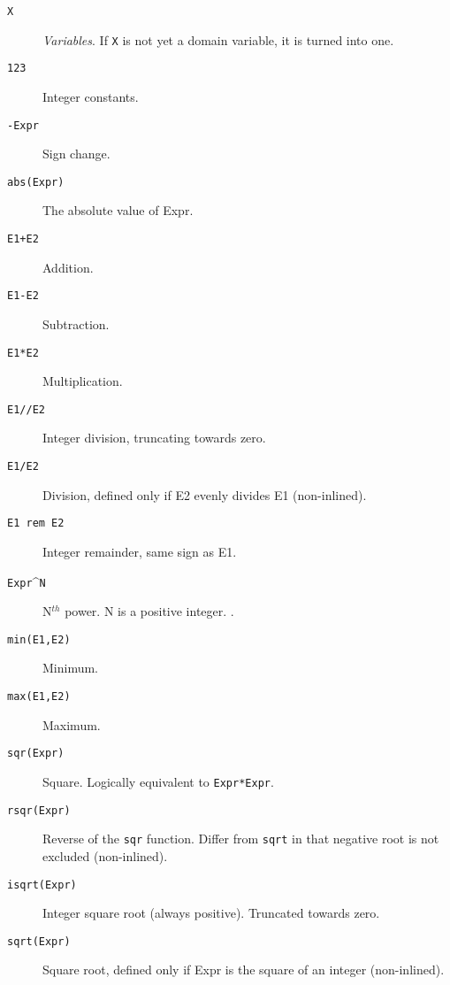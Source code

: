 \begin{description}
\item[\texttt{X}]
            \emph{Variables}.  If \verb'X' is not yet a domain variable, it is turned 
            into one.

\item[\texttt{123}]
            Integer constants.

\item[\texttt{-Expr}]
            Sign change.

\item[\texttt{abs(Expr)}]
    The absolute value of Expr.

\item[\texttt{E1+E2}]
    Addition.

\item[\texttt{E1-E2}]
    Subtraction.

\item[\texttt{E1*E2}]
    Multiplication.

\item[\texttt{E1//E2}]
    Integer division, truncating towards zero.

\item[\texttt{E1/E2}]
    Division, defined only if E2 evenly divides E1 (non-inlined).

\item[\texttt{E1 rem E2}]
            Integer remainder, same sign as E1.

\item[\texttt{Expr}\textasciicircum{}{\texttt N}]
            N$^{th}$ power. N is a positive integer. .

\item[\texttt{min(E1,E2)}]
    Minimum.

\item[\texttt{max(E1,E2)}]
    Maximum.

\item[\texttt{sqr(Expr)}]
    Square. Logically equivalent to \verb|Expr*Expr|.

\item[\texttt{rsqr(Expr)}]
    Reverse of the \texttt{sqr} function. Differ from \texttt{sqrt} in that
    negative root is not excluded (non-inlined).

\item[\texttt{isqrt(Expr)}]
            Integer square root (always positive). Truncated towards zero.

\item[\texttt{sqrt(Expr)}]
            Square root, defined only if Expr is the square of an integer
	    (non-inlined).


\end{description}
